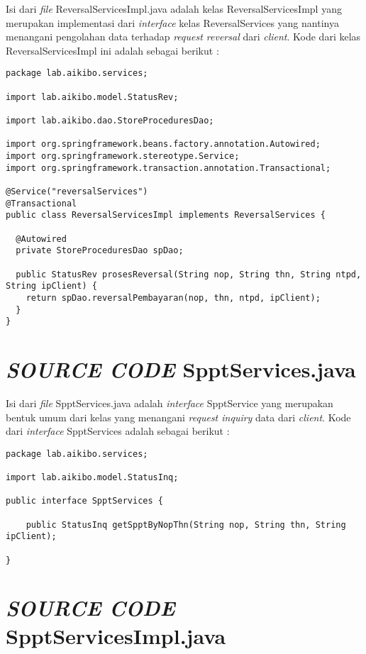\documentclass[pdftex,12pt, oneside]{article}
\begin{document}
Isi dari \textit{file} ReversalServicesImpl.java adalah kelas ReversalServicesImpl yang merupakan implementasi dari \textit{interface} kelas ReversalServices yang nantinya menangani pengolahan data terhadap \textit{request reversal} dari \textit{client}. Kode dari kelas ReversalServicesImpl ini adalah sebagai berikut :

\begin{lstlisting}
package lab.aikibo.services;

import lab.aikibo.model.StatusRev;

import lab.aikibo.dao.StoreProceduresDao;

import org.springframework.beans.factory.annotation.Autowired;
import org.springframework.stereotype.Service;
import org.springframework.transaction.annotation.Transactional;

@Service("reversalServices")
@Transactional
public class ReversalServicesImpl implements ReversalServices {

  @Autowired
  private StoreProceduresDao spDao;

  public StatusRev prosesReversal(String nop, String thn, String ntpd, String ipClient) {
    return spDao.reversalPembayaran(nop, thn, ntpd, ipClient);
  }
}
\end{lstlisting}


\section{\textit{SOURCE CODE} SpptServices.java}

Isi dari \textit{file} SpptServices.java adalah \textit{interface} SpptService yang merupakan bentuk umum dari kelas yang menangani \textit{request inquiry} data dari \textit{client}. Kode dari \textit{interface} SpptServices adalah sebagai berikut :

\begin{lstlisting}
package lab.aikibo.services;

import lab.aikibo.model.StatusInq;

public interface SpptServices {

	public StatusInq getSpptByNopThn(String nop, String thn, String ipClient);

}
\end{lstlisting}


\section{\textit{SOURCE CODE} SpptServicesImpl.java}
\end{document}
